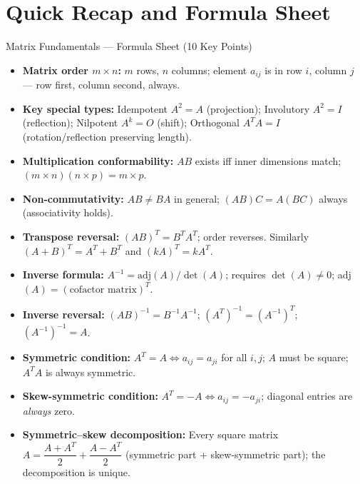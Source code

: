 \documentclass[12pt,a4paper]{article}
\begin{document}
\section{Quick Recap and Formula Sheet}

\begin{learnbox}{Matrix Fundamentals --- Formula Sheet (10 Key Points)}
\begin{itemize}
  \item \textbf{Matrix order $m \times n$:} $m$ rows, $n$ columns; element $a_{ij}$ is in row $i$, column $j$ --- row first, column second, always.
  \item \textbf{Key special types:} Idempotent $A^2 = A$ (projection); Involutory $A^2 = I$ (reflection); Nilpotent $A^k = O$ (shift); Orthogonal $A^T A = I$ (rotation/reflection preserving length).
  \item \textbf{Multiplication conformability:} $AB$ exists iff inner dimensions match; $(m \times n)(n \times p) = m \times p$.
  \item \textbf{Non-commutativity:} $AB \neq BA$ in general; $(AB)C = A(BC)$ always (associativity holds).
  \item \textbf{Transpose reversal:} $(AB)^T = B^T A^T$; order reverses. Similarly $(A+B)^T = A^T + B^T$ and $(kA)^T = kA^T$.
  \item \textbf{Inverse formula:} $A^{-1} = \text{adj}(A) / \det(A)$; requires $\det(A) \neq 0$; adj$(A) = (\text{cofactor matrix})^T$.
  \item \textbf{Inverse reversal:} $(AB)^{-1} = B^{-1} A^{-1}$; $(A^T)^{-1} = (A^{-1})^T$; $(A^{-1})^{-1} = A$.
  \item \textbf{Symmetric condition:} $A^T = A \Leftrightarrow a_{ij} = a_{ji}$ for all $i, j$; $A$ must be square; $A^T A$ is always symmetric.
  \item \textbf{Skew-symmetric condition:} $A^T = -A \Leftrightarrow a_{ij} = -a_{ji}$; diagonal entries are \emph{always} zero.
  \item \textbf{Symmetric--skew decomposition:} Every square matrix $A = \dfrac{A + A^T}{2} + \dfrac{A - A^T}{2}$ (symmetric part + skew-symmetric part); the decomposition is unique.
\end{itemize}
\end{learnbox}
\end{document}
